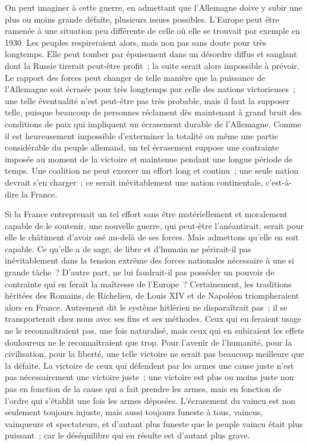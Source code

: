 \documentclass[french,twoside]{book} %
\begin{document}
On peut imaginer à cette guerre, en admettant que l'Allemagne doive y subir une plus ou moins grande défaite, plusieurs issues possibles. L'Europe peut être ramenée à une situation peu différente de celle où elle se trouvait par exemple en 1930. Les peuples respireraient alors, mais non pas sans doute pour très longtemps. Elle peut tomber par épuisement dans un désordre diffus et sanglant dont la Russie tirerait peut-être profit ; la suite serait alors impossible à prévoir. Le rapport des forces peut changer de telle manière que la puissance de l'Allemagne soit écrasée pour très longtemps par celle des nations victorieuses ; une telle éventualité n'est peut-être pas très probable, mais il faut la supposer telle, puisque beaucoup de personnes réclament dès maintenant à grand bruit des conditions de paix qui impliquent un écrasement durable de l'Allemagne. Comme il est heureusement impossible d'exterminer la totalité ou même une partie considérable du peuple allemand, un tel écrase­ment suppose une contrainte imposée au moment de la victoire et maintenue pendant une longue période de temps. Une coalition ne peut exercer un effort long et continu ; une seule nation devrait s'en charger ; ce serait inévitable­ment une nation continentale, c'est-à-dire la France.\par
Si la France entreprenait un tel effort sans être matériellement et morale­ment capable de le soutenir, une nouvelle guerre, qui peut-être l'anéantirait, serait pour elle le châtiment d'avoir osé au-delà de ses forces. Mais admettons qu'elle en soit capable. Ce qu'elle a de sage, de libre et d'humain ne périrait-il pas inévitablement dans la tension extrême des forces nationales nécessaire à une si grande tâche ? D'autre part, ne lui faudrait-il pas posséder un pouvoir de contrainte qui en ferait la maîtresse de l'Europe ? Certainement, les traditions héritées des Romains, de Richelieu, de Louis XIV et de Napoléon triomphe­raient alors en France. Autrement dit le système hitlérien ne disparaîtrait pas ; il se transporterait chez nous avec ses fins et ses méthodes. Ceux qui en feraient usage ne le reconnaîtraient pas, une fois naturalisé, mais ceux qui en subiraient les effets douloureux ne le reconnaîtraient que trop. Pour l'avenir de l'humanité, pour la civilisation, pour la liberté, une telle victoire ne serait pas beaucoup meilleure que la défaite. La victoire de ceux qui défendent par les armes une cause juste n'est pas nécessairement une victoire juste ; une victoire est plus ou moins juste non pas en fonction de la cause qui a fait prendre les armes, mais en fonction de l'ordre qui s'établit une fois les armes déposées. L'écrasement du vaincu est non seulement toujours injuste, mais aussi toujours funeste à tous, vaincus, vainqueurs et spectateurs, et d'autant plus funeste que le peuple vaincu était plus puissant ; car le déséquilibre qui en résulte est d'autant plus grave.\par
\end{document}
